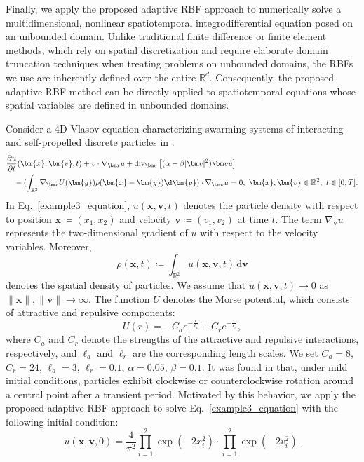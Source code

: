 Finally, we apply the proposed adaptive RBF approach to numerically solve a multidimensional, nonlinear spatiotemporal integrodifferential equation posed on an unbounded domain. Unlike traditional finite difference or finite element methods, which rely on spatial discretization and require elaborate domain truncation techniques when treating problems on unbounded domains, the RBFs we use are inherently defined over the entire $\mathbb{R}^d$. Consequently, the proposed adaptive RBF method can be directly applied to spatiotemporal equations whose spatial variables are defined in unbounded domains. 
\begin{example}
\rm
    \label{example3}
Consider a 4D Vlasov equation characterizing swarming systems of interacting and self-propelled discrete particles in \cite{carrillo2009double,muntean2014collective}:
\begin{equation}
    \begin{aligned}
    &\frac{\partial u}{\partial t}(\bm{x}, \bm{v}, t) + v \cdot \nabla_{\bm x} u + \text{div}_{\bm v}\left[(\alpha - \beta|\bm v|^2)\bm v u\right] \\
    &\quad- (\int_{\mathbb{R}^2}\nabla_{\bm x} U(\bm{y}) \rho(\bm{x}-\bm{y})\d \bm{y})\cdot\nabla_{\bm v} u = 0,\,\,
    \bm{x}, \bm{v}\in\mathbb{R}^2,\,\, t\in[0, T].
    \end{aligned}
    \label{example3_equation}
\end{equation}
In Eq.~\eqref{example3_equation}, $u(\bm{x}, \bm{v}, t)$ denotes the particle density with respect to position $\bm{x} \coloneqq (x_1,x_2)$ and velocity $\bm{v} \coloneqq (v_1,v_2)$ at time $t$. The term $\nabla_{\bm{v}} u$ represents the two-dimensional gradient of $u$ with respect to the velocity variables. Moreover,
\[
\rho(\bm{x},t) \coloneqq \int_{\mathbb{R}^2} u(\bm{x},\bm{v},t)\,\mathrm{d}\bm{v}
\]
denotes the spatial density of particles. We assume that $u(\bm{x},\bm{v},t) \to 0$ as $\|\bm{x}\|,\|\bm{v}\| \to \infty$. The function $U$ denotes the Morse potential, which consists of attractive and repulsive components:
\begin{equation}
    U(r) = -C_a e^{-\frac{r}{\ell_a}} + C_r e^{-\frac{r}{\ell_r}},
\end{equation}
where $C_a$ and $C_r$ denote the strengths of the attractive and repulsive interactions, respectively, and $\ell_a$ and $\ell_r$ are the corresponding length scales. We set $C_a = 8$, $C_r = 24$, $\ell_a = 3$, $\ell_r = 0.1$, $\alpha = 0.05$, $\beta = 0.1$. %
It was found in \cite{carrillo2009double} that, under mild initial conditions, particles exhibit clockwise or counterclockwise rotation around a central point after a transient period. Motivated by this behavior, we apply the proposed adaptive RBF approach to solve Eq.~\eqref{example3_equation} with the following initial condition:
\begin{equation}
    u(\bm{x}, \bm{v}, 0)=\frac{4}{\pi^2}\prod_{i=1}^2\exp(-2x_i^2)\cdot \prod_{i=1}^2\exp(-2v_i^2).
\end{equation}


\end{example}
